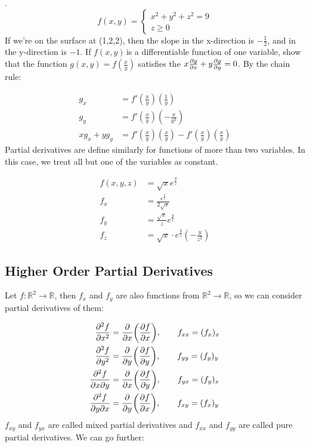 \documentclass{article}
\newcommand{\n}{\leavevmode \newline} %
\newcommand{\nn}{\leavevmode \newline \newline} %
\newcommand{\R}{\mathbb{R}} %
\newcommand{\fxy}{$f(x,y)\,$} %
\numberwithin{equation}{subsection} %
\begin{document}
.
\begin{equation}
    f(x,y)=\left\{
    \begin{array}{ll}
        x^2+y^2+z^2=9\\
        z\geq0
    \end{array}
    \right.
\end{equation}
\n
If we're on the surface at (1,2,2), then the slope in the x-direction is $-\frac{1}{2}$, and in the y-direction is $-1$.
\nn
If \fxy is a differentiable function of one variable, show that the function $g(x,y)=f(\frac{x}{y})$ satisfies the  $x\pdv{g}{x}+y\pdv{g}{y}=0$. By the chain rule:

\begin{equation}
    \begin{split}
        g_x&=f'\left(\frac{x}{y}\right)\left(\frac{1}{y}\right)\\
        g_y&=f'\left(\frac{x}{y}\right)\left(-\frac{x}{y^2}\right)\\
        xg_x+yg_y&=f'\left(\frac{x}{y}\right)\left(\frac{x}{y}\right)-f'\left(\frac{x}{y}\right)\left(\frac{x}{y}\right)
    \end{split}
\end{equation}
\n
Partial derivatives are define similarly for functions of more than two variables. In this case, we treat all but one of the variables as constant.

\begin{equation}
    \begin{split}
        f(x,y,z)&=\sqrt{x}e^\frac{y}{z}\\
        f_x&=\frac{e^\frac{y}{z}}{2\sqrt{x}}\\
        f_y&=\frac{\sqrt{x}}{z}e^\frac{y}{z}\\
        f_z&=\sqrt{x}\cdot e^\frac{y}{z}\left(-\frac{y}{z^2}\right)
    \end{split}
\end{equation}

\subsection{Higher Order Partial Derivatives}
Let $f:\R^2\to\R$, then $f_x$ and $f_y$ are also functions from $\R^2\to\R$, so we can consider partial derivatives of them:

\begin{equation}
    \begin{split}
        \pdv[2]{f}{x}&=\pdv{x}(\pdv{f}{x}), \qquad f_{xx}=(f_x)_x\\
        \pdv[2]{f}{y}&=\pdv{y}(\pdv{f}{y}), \qquad f_{yy}=(f_y)_y\\
        \pdv{f}{x}{y}&=\pdv{x}(\pdv{f}{y}), \qquad f_{yx}=(f_y)_x\\
        \pdv{f}{y}{x}&=\pdv{y}(\pdv{f}{x}), \qquad f_{xy}=(f_x)_y
    \end{split}
\end{equation}
\n
$f_{xy}$ and $f_{yx}$ are called mixed partial derivatives and $f_{xx}$ and $f_{yy}$ are called pure partial derivatives. We can go further:
\end{document}
